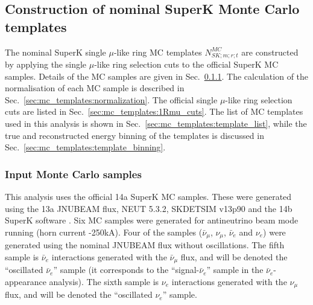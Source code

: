 
\subsection {Construction of nominal SuperK Monte Carlo templates}
\label{sec:mc_templates}

The nominal SuperK single $\mu$-like ring MC templates $N_{SK;m;r;t}^{MC}$
are constructed by applying the single $\mu$-like ring selection cuts to the official SuperK MC samples.
Details of the MC samples are given in Sec.~\ref{sec:mc_templates:input_mc}.
The calculation of the normalisation of each MC sample is described in Sec.~\ref{sec:mc_templates:normalization}.
The official single $\mu$-like ring selection cuts are listed in Sec.~\ref{sec:mc_templates:1Rmu_cuts}.
The list of MC templates used in this analysis is shown in Sec.~\ref{sec:mc_templates:template_list},
while the true and reconstructed energy binning of the templates is discussed 
in Sec.~\ref{sec:mc_templates:template_binning}.

\subsubsection {Input Monte Carlo samples}
\label{sec:mc_templates:input_mc}


This analysis uses the official 14a SuperK MC samples. These were generated using the 13a JNUBEAM flux, NEUT 5.3.2, 
SKDETSIM v13p90 and the 14b SuperK software \cite{SuperkMC14a}. Six MC samples were generated for antineutrino beam 
mode running (horn current -250kA). Four of the samples ($\bar{\nu}_{\mu}$, $\nu_{\mu}$, $\bar{\nu}_{e}$ and $\nu_{e}$) 
were generated using the nominal JNUBEAM flux without oscillations.
The fifth sample is $\bar{\nu}_{e}$ interactions generated with the $\bar{\nu}_{\mu}$ flux, and will be denoted the 
``oscillated $\bar{\nu}_{e}$'' sample (it corresponds to the ``signal-$\bar{\nu}_{e}$'' sample in the 
$\bar{\nu}_{e}$-appearance analysis). The sixth sample is $\nu_{e}$ interactions generated with the $\nu_{\mu}$ flux, 
and will be denoted the ``oscillated $\nu_{e}$'' sample.

